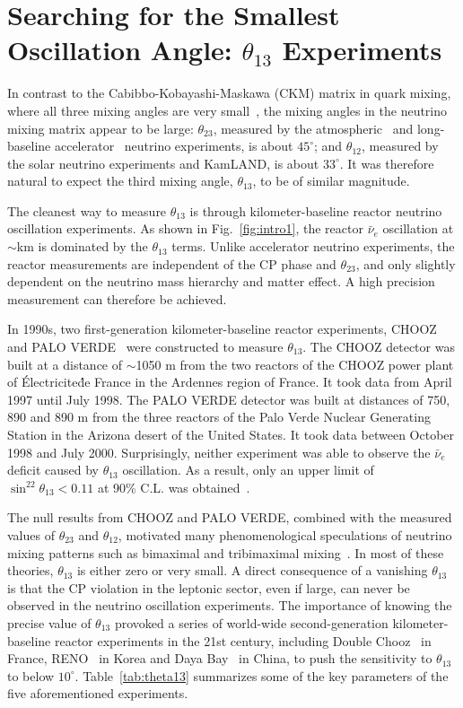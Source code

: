 \section{Searching for the Smallest Oscillation Angle: $\theta_{13}$ Experiments} 
\label{sec:theta13}
In contrast to the  Cabibbo-Kobayashi-Maskawa (CKM) matrix in quark mixing, where all three mixing angles are very small~\cite{PDG14}, the mixing angles in the neutrino mixing matrix appear to be large: $\theta_{23}$, measured by the atmospheric~\cite{Kajita} and long-baseline accelerator~\cite{Feldman} neutrino experiments, is about $45^\circ$; and $\theta_{12}$, measured by the solar neutrino experiments and KamLAND, is about $33^\circ$. It was therefore natural to expect the third mixing angle, $\theta_{13}$, to be of similar magnitude.

The cleanest way to measure $\theta_{13}$ is through kilometer-baseline reactor neutrino oscillation experiments. As shown in Fig.~\ref{fig:intro1}, the reactor $\bar\nu_e$ oscillation at $\sim$km is dominated by the $\theta_{13}$ terms. Unlike accelerator neutrino experiments, the reactor measurements are independent of the CP phase and $\theta_{23}$, and only slightly dependent on the neutrino mass hierarchy and matter effect. A high precision measurement can therefore be achieved.

In 1990s, two first-generation kilometer-baseline reactor experiments, CHOOZ~\cite{Chooz} and PALO VERDE~\cite{Paloverde} were constructed to measure $\theta_{13}$. 
The CHOOZ detector was built at a distance of $\sim$1050 m from the two reactors of the CHOOZ power plant of \'{E}lectricite\'{d}e France in the Ardennes region of France. It took data from April 1997 until July 1998. 
The PALO VERDE detector was built at distances of 750, 890 and 890 m from the three reactors of the Palo Verde Nuclear Generating Station in the Arizona desert of the United States. It took data between October 1998 and July 2000. 
Surprisingly, neither experiment was able to observe the $\bar\nu_e$ deficit caused by $\theta_{13}$ oscillation. 
As a result, only an upper limit of $\sin^22\theta_{13} < 0.11$ at 90\% C.L. was obtained~\cite{Chooz}.

The null results from CHOOZ and PALO VERDE, combined with the measured values of $\theta_{23}$ and $\theta_{12}$, motivated many phenomenological speculations of neutrino mixing patterns such as bimaximal and tribimaximal mixing~\cite{Harrison,Altarelli}. 
In most of these theories, $\theta_{13}$ is either zero or very small. 
A direct consequence of a vanishing $\theta_{13}$ is that the CP violation in the leptonic sector, even if large, can never be observed in the neutrino oscillation experiments. 
The importance of knowing the precise value of $\theta_{13}$ provoked a series of world-wide second-generation kilometer-baseline reactor experiments in the 21st century, including Double Chooz~\cite{DChooz} in France, RENO~\cite{Reno} in Korea and Daya Bay~\cite{Dayabay} in China, to push the sensitivity to $\theta_{13}$ to below $10^\circ$. 
Table~\ref{tab:theta13} summarizes some of the key parameters of the five aforementioned experiments.

